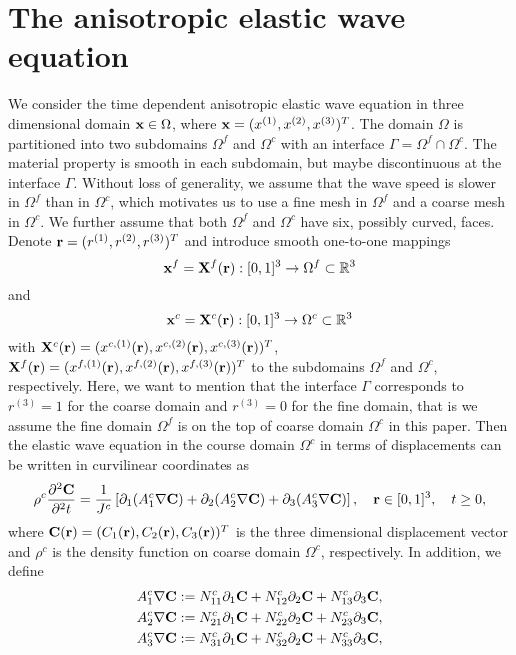 \section{The anisotropic elastic wave equation }
We consider the time dependent anisotropic elastic wave equation in three dimensional domain ${\bf x}\in\Omega$, where ${\bf x} = (x^{(1)},x^{(2)},x^{(3)})^T$. 
The domain $\Omega$ is partitioned into two subdomains $\Omega^f$ and $\Omega^c$ with an interface $\Gamma = \Omega^f\cap\Omega^c$. The material property is smooth in each subdomain, but maybe discontinuous at the interface $\Gamma$. Without loss of generality, we assume that the wave speed is slower in $\Omega^f$ than in $\Omega^c$, which motivates us to use a fine mesh in $\Omega^f$ and a coarse mesh in $\Omega^c$.  We further assume that both $\Omega^f$ and $\Omega^c$ have six, possibly curved, faces. Denote ${\bf r} = (r^{(1)},r^{(2)},r^{(3)})^T$ and  introduce smooth one-to-one mappings 
\[{\bf x}^{f} = {\bf X}^{f}({\bf r}) :  [0,1]^3 \rightarrow \Omega^{f} \subset \mathbb{R}^3 \]
and 
\[{\bf x}^{c} = {\bf X}^{c}({\bf r}) :  [0,1]^3 \rightarrow \Omega^{c} \subset \mathbb{R}^3\]
with ${\bf X}^{c}({\bf r}) = (x^{c,(1)}({\bf r}),x^{c,(2)}({\bf r}),x^{c,(3)}({\bf r}))^T$, ${\bf X}^{f}({\bf r}) = (x^{f,(1)}({\bf r}),x^{f,(2)}({\bf r}),x^{f,(3)}({\bf r}))^T$ to the subdomains $\Omega^f$ and $\Omega^c$,  respectively. Here, we want to mention that the interface $\Gamma$ corresponds to $r^{(3)} = 1$ for the coarse domain and $r^{(3)} = 0$ for the fine domain, that is we assume the fine domain $\Omega^f$ is on the top of coarse domain $\Omega^c$ in this paper. Then the elastic wave equation in the course domain $\Omega^c$ in terms of displacements can be written in curvilinear coordinates as
\begin{align}\label{elastic_curvi}
	\rho^c\frac{\partial^2{\bf C}}{\partial^2 t} = \frac{1}{J^c}\left[\partial_1(A_1^c\nabla{\bf C}) + \partial_2(A_2^c\nabla{\bf C}) +\partial_3(A_3^c\nabla{\bf C}) \right],\ \ \  {\bf r}\in[0,1]^3,\ \ \  t\geq0,
\end{align}
where ${\bf C}({\bf r}) = (C_1({\bf r}),C_2({\bf r}),C_3({\bf r}))^T$ is the three dimensional displacement vector and $\rho^c$ is the density function on coarse domain $\Omega^c$, respectively. In addition, we define
\begin{align*} 
	A_1^c\nabla{\bf C} &:= N_{11}^c\partial_1{\bf C} + N_{12}^c\partial_2{\bf C} + N_{13}^c\partial_3{\bf C}, \\
	A_2^c\nabla{\bf C} &:= N_{21}^c\partial_1{\bf C} + N_{22}^c\partial_2{\bf C} + N_{23}^c\partial_3{\bf C}, \\
	A_3^c\nabla{\bf C} &:= N_{31}^c\partial_1{\bf C} + N_{32}^c\partial_2{\bf C} + N_{33}^c\partial_3{\bf C},
\end{align*}
